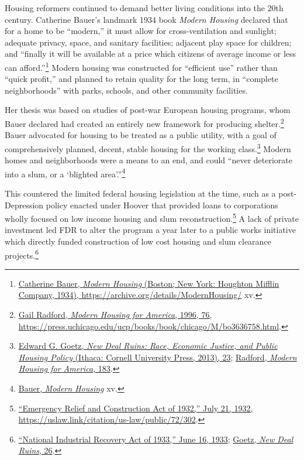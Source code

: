 \documentclass[
  openany]{book}
\begin{document}
Housing reformers continued to demand better living conditions into the 20th century. Catherine Bauer's landmark 1934 book \emph{Modern Housing} declared that for a home to be ``modern,'' it must allow for cross-ventilation and sunlight; adequate privacy, space, and sanitary facilities; adjacent play space for children; and ``finally it will be available at a price which citizens of average income or less can afford.''\footnote{\protect\hyperlink{ref-bauer1934}{Catherine Bauer, \emph{Modern Housing} (Boston; New York: Houghton Mifflin Company, 1934), \url{https://archive.org/details/ModernHousing/}} xv.} Modern housing was constructed for ``efficient use'' rather than ``quick profit,'' and planned to retain quality for the long term, in ``complete neighborhoods'' with parks, schools, and other community facilities.

Her thesis was based on studies of post-war European housing programs, whom Bauer declared had created an entirely new framework for producing shelter.\footnote{\protect\hyperlink{ref-radford1996}{Gail Radford, \emph{Modern Housing for America}, 1996, 76, \url{https://press.uchicago.edu/ucp/books/book/chicago/M/bo3636758.html}}.} Bauer advocated for housing to be treated as a public utility, with a goal of comprehensively planned, decent, stable housing for the working class.\footnote{\protect\hyperlink{ref-goetz2013}{Edward G. Goetz, \emph{New Deal Ruins: Race, Economic Justice, and Public Housing Policy} (Ithaca: Cornell University Press, 2013), 23}; \protect\hyperlink{ref-radford1996}{Radford, \emph{Modern Housing for America}, 183}.} Modern homes and neighborhoods were a means to an end, and could ``never deteriorate into a slum, or a `blighted area'.''\footnote{\protect\hyperlink{ref-bauer1934}{Bauer, \emph{Modern Housing}} xv.}

This countered the limited federal housing legislation at the time, such as a post-Depression policy enacted under Hoover that provided loans to corporations wholly focused on low income housing and slum reconstruction.\footnote{\protect\hyperlink{ref-emergenc1932}{{``Emergency Relief and Construction Act of 1932,''} July 21, 1932, \url{https://uslaw.link/citation/us-law/public/72/302}}.} A lack of private investment led FDR to alter the program a year later to a public works initiative which directly funded construction of low cost housing and slum clearance projects.\footnote{\protect\hyperlink{ref-national1933}{{``National Industrial Recovery Act of 1933,''} June 16, 1933}; \protect\hyperlink{ref-goetz2013}{Goetz, \emph{New Deal Ruins}, 26}.}
\end{document}
